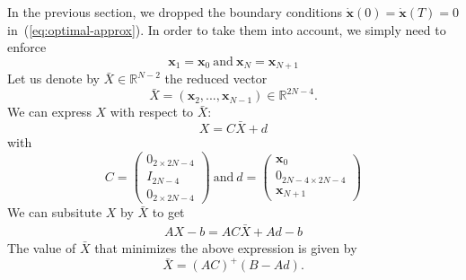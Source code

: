 \documentclass{article}
\newcommand\vect[1]{\mathbf{#1}}
\newcommand\x{\vect{x}}
\newcommand\dx{\vect{\dot{x}}}
\newcommand\reals{\mathbb{R}}
\newcommand\Xbar{\bar{X}}
\begin{document}
In the previous section, we dropped the boundary conditions $\dx(0)=\dx(T)=0$ in~(\ref{eq:optimal-approx}). In order to take them into account, we simply need to enforce
$$
\x_{1} = \x_{0}\ \mbox{and}\ \x_{N} = \x_{N+1}
$$
Let us denote by $\Xbar\in\reals^{N-2}$ the reduced vector
$$
\Xbar = (\x_2,...,\x_{N-1})\in\reals^{2N-4}.
$$
We can express $X$ with respect to $\Xbar$:
$$
X = C\Xbar + d
$$
with
$$
C = \left(\begin{array}{c}
  0_{2\times 2N-4}\\
  I_{2N-4}\\
  0_{2\times 2N-4}
\end{array}\right)\
\mbox{and}\ d=\left(\begin{array}{c}
  \x_0\\
  0_{2N-4\times 2N-4}\\
  \x_{N+1}
\end{array}\right)
$$
We can subsitute $X$ by $\Xbar$ to get
\begin{eqnarray*}
  AX-b = AC\Xbar+Ad - b
\end{eqnarray*}
The value of $\Xbar$ that minimizes the above expression is given by
$$
\Xbar = (AC)^{+}(B-Ad).
$$
\end{document}
